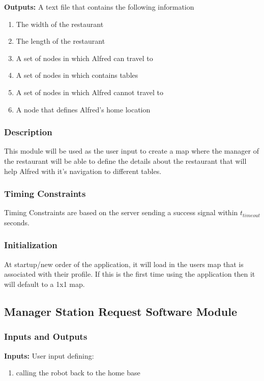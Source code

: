\documentclass [10pt]{article}
\begin{document}
\textbf{Outputs: } A text file that contains the following information
\begin{enumerate}
	\item The width of the restaurant
	\item The length of the restaurant
	\item A set of nodes in which Alfred can travel to
	\item A set of nodes in which contains tables
	\item A set of nodes in which Alfred cannot travel to
	\item A node that defines Alfred's home location
\end{enumerate}
\subsubsection{Description}
This module will be used as the user input to create a map where the manager of the restaurant will be able to define the details about the restaurant that will help Alfred with it's navigation to different tables.

\subsubsection{Timing Constraints}
Timing Constraints are based on the server sending a success signal within  $ t_{timeout} $ seconds.

\subsubsection{Initialization}
At startup/new order of the application, it will load in the users map that is associated with their profile. If this is the first time using the application then it will default to a 1x1 map.

\subsection{Manager Station Request Software Module}

\subsubsection{Inputs and Outputs}

\textbf{Inputs: } User input defining:
\begin{enumerate}
	\item calling the robot back to the home base
\end{enumerate}
\end{document}
